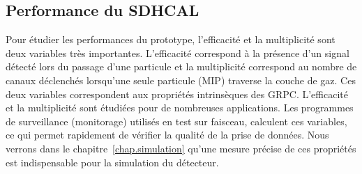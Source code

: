 \subsection{Performance du SDHCAL}
\label{sec.muons}
Pour étudier les performances du prototype, l'efficacité et la multiplicité sont deux variables très importantes. L'efficacité correspond à la présence d'un signal détecté lors du passage d'une particule et la multiplicité correspond au nombre de canaux déclenchés lorsqu'une seule particule (MIP) traverse la couche de gaz. Ces deux variables correspondent aux propriétés intrinsèques des GRPC. L'efficacité et la multiplicité sont étudiées pour de nombreuses applications. Les programmes de surveillance (monitorage) utilisés en test sur faisceau, calculent ces variables, ce qui permet rapidement de vérifier la qualité de la prise de données. Nous verrons dans le chapitre~\ref{chap.simulation} qu'une mesure précise de ces propriétés est indispensable pour la simulation du détecteur.

